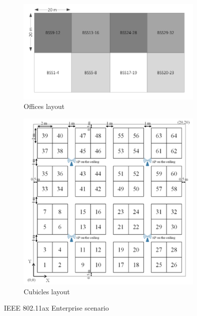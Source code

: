\documentclass[12pt, a4paper,twoside]{tesi_upf}
\begin{document}
\begin{itemize}
			\begin{figure}[t!]
				\centering
				\begin{subfigure}[b]{0.4\textwidth}
					\includegraphics[width=\textwidth]{images/enterprise_ax_1}
					\caption{Offices layout}
					\label{fig:offices}
				\end{subfigure}
				\begin{subfigure}[b]{0.4\textwidth}
					\includegraphics[width=\textwidth]{images/enterprise_ax_2}
					\caption{Cubicles layout}
					\label{fig:cubicles}
				\end{subfigure}		
				\caption{IEEE 802.11ax Enterprise scenario}
				\label{fig:ax_enterprise_scenario}
			\end{figure}
		

\end{itemize}
\end{document}
